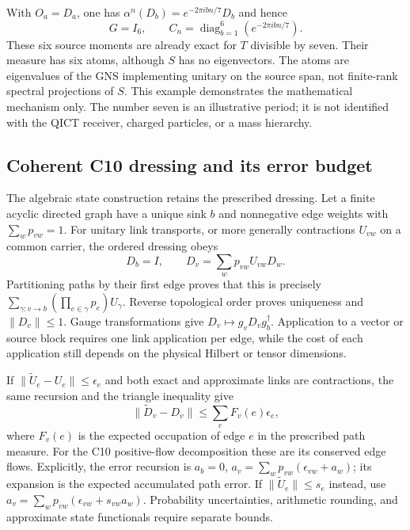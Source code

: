 With $O_a=D_a$, one has $\alpha^n(D_b)=e^{-2\pi ibn/7}D_b$ and hence
\begin{equation}
 G=I_6,\qquad
 C_n=\operatorname{diag}_{b=1}^6(e^{-2\pi ibn/7}).
 \label{eq:algebraic-shift-six-moments}
\end{equation}
These six source moments are already exact for $T$ divisible by seven.
Their measure has six atoms, although $S$ has no eigenvectors. The atoms
are eigenvalues of the GNS implementing unitary on the source span, not
finite-rank spectral projections of $S$. This example demonstrates the
mathematical mechanism only. The number seven is an illustrative period;
it is not identified with the QICT receiver, charged particles, or a mass
hierarchy.

\subsection{Coherent C10 dressing and its error budget}

The algebraic state construction retains the prescribed dressing. Let a
finite acyclic directed graph have a unique sink $b$ and nonnegative edge
weights with $\sum_w p_{vw}=1$. For unitary link transports, or more generally
contractions $U_{vw}$ on a common carrier, the ordered dressing obeys
\begin{equation}
 D_b=I,\qquad D_v=\sum_w p_{vw}U_{vw}D_w.
 \label{eq:algebraic-dag-recursion}
\end{equation}
Partitioning paths by their first edge proves that this is precisely
$\sum_{\gamma:v\to b}(\prod_{e\in\gamma}p_e)U_\gamma$. Reverse topological
order proves uniqueness and $\|D_v\|\leq1$. Gauge transformations give
$D_v\mapsto g_vD_vg_b^\dagger$. Application to a vector or source block
requires one link application per edge, while the cost of each application
still depends on the physical Hilbert or tensor dimensions.

If $\|\widetilde U_e-U_e\|\leq\epsilon_e$ and both exact and approximate
links are contractions, the same recursion and the triangle inequality give
\begin{equation}
 \|\widetilde D_v-D_v\|\leq\sum_e F_v(e)\epsilon_e,
 \label{eq:algebraic-dag-error}
\end{equation}
where $F_v(e)$ is the expected occupation of edge $e$ in the prescribed path
measure. For the C10 positive-flow decomposition these are its conserved
edge flows. Explicitly, the error recursion is
$a_b=0$, $a_v=\sum_w p_{vw}(\epsilon_{vw}+a_w)$; its expansion is the
expected accumulated path error. If
$\|\widetilde U_e\|\leq s_e$ instead, use
$a_v=\sum_w p_{vw}(\epsilon_{vw}+s_{vw}a_w)$.
Probability uncertainties, arithmetic rounding, and approximate state
functionals require separate bounds.

